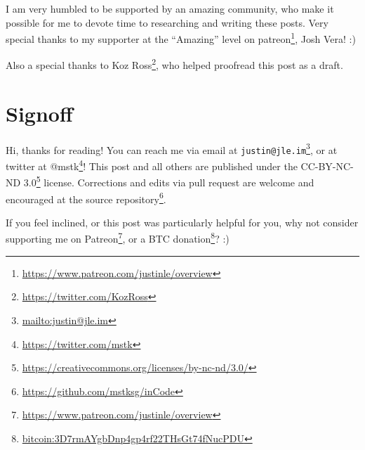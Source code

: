 \documentclass[]{article}
\renewcommand{\href}[2]{#2\footnote{\url{#1}}}
\begin{document}
I am very humbled to be supported by an amazing community, who make it possible
for me to devote time to researching and writing these posts. Very special
thanks to my supporter at the ``Amazing'' level on
\href{https://www.patreon.com/justinle/overview}{patreon}, Josh Vera! :)

Also a special thanks to \href{https://twitter.com/KozRoss}{Koz Ross}, who
helped proofread this post as a draft.

\section{Signoff}\label{signoff}

Hi, thanks for reading! You can reach me via email at
\href{mailto:justin@jle.im}{\nolinkurl{justin@jle.im}}, or at twitter at
\href{https://twitter.com/mstk}{@mstk}! This post and all others are published
under the \href{https://creativecommons.org/licenses/by-nc-nd/3.0/}{CC-BY-NC-ND
3.0} license. Corrections and edits via pull request are welcome and encouraged
at \href{https://github.com/mstksg/inCode}{the source repository}.

If you feel inclined, or this post was particularly helpful for you, why not
consider \href{https://www.patreon.com/justinle/overview}{supporting me on
Patreon}, or a \href{bitcoin:3D7rmAYgbDnp4gp4rf22THsGt74fNucPDU}{BTC donation}?
:)
\end{document}
